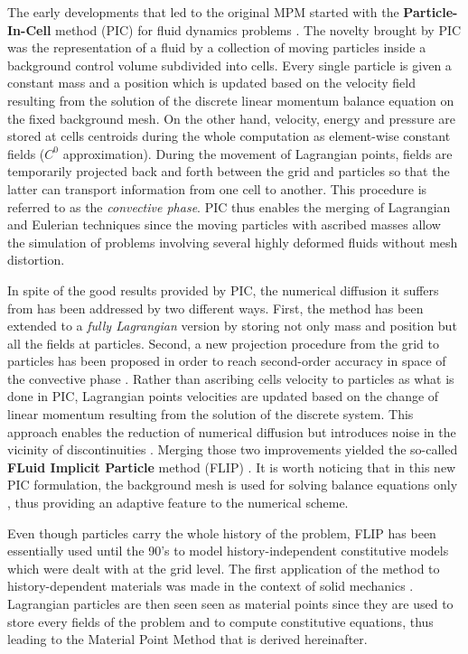 The early developments that led to the original MPM started with the \textbf{Particle-In-Cell} method (PIC) for fluid dynamics problems \cite{PIC}. The novelty brought by PIC was the representation of a fluid by a collection of moving particles inside a background control volume subdivided into cells. Every single particle is given a constant mass and a position which is updated based on the velocity field resulting from the solution of the discrete linear momentum balance equation on the fixed background mesh. On the other hand, velocity, energy and pressure are stored at cells centroids during the whole computation as element-wise constant fields ($C^0$ approximation). 
During the movement of Lagrangian points, fields are temporarily projected back and forth between the grid and particles so that the latter can transport information from one cell to another. This procedure is referred to as the \textit{convective phase}. PIC thus enables the merging of Lagrangian and Eulerian techniques since the moving particles with ascribed masses allow the simulation of problems involving several highly deformed fluids without mesh distortion.

In spite of the good results provided by PIC, the numerical diffusion it suffers from has been addressed by two different ways. First, the method has been extended to a \textit{fully Lagrangian} version \cite{McCrory_FLIP} by storing not only mass and position but all the fields at particles. Second, a new projection procedure from the grid to particles has been proposed in order to reach second-order accuracy in space of the convective phase \cite{PIC_Nishiguchi}. 
Rather than ascribing cells velocity to particles as what is done in PIC, Lagrangian points velocities are updated based on the change of linear momentum resulting from the solution of the discrete system. This approach enables the reduction of numerical diffusion but introduces noise in the vicinity of discontinuities \cite{Mass_Flip}.
Merging those two improvements yielded the so-called \textbf{FLuid Implicit Particle} method (FLIP) \cite{FLIP}. It is worth noticing that in this new PIC formulation, the background mesh is used for solving balance equations only , thus providing an adaptive feature to the numerical scheme. 


Even though particles carry the whole history of the problem, FLIP has been essentially used until the 90's to model history-independent constitutive models which were dealt with at the grid level. The first application of the method to history-dependent materials was made in the context of solid mechanics \cite{Sulsky94}. Lagrangian particles are then seen seen as material points since they are used to store every fields of the problem and to compute constitutive equations, thus leading to the Material Point Method that is derived hereinafter. 

